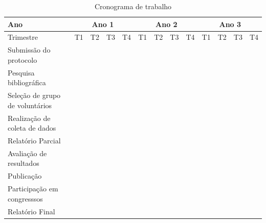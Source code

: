 \documentclass[rascunho,xindy]{Classe-Latex-FEI/fei}
\begin{document}
\begin{table}[ht]
  \caption{Cronograma de trabalho}
  \begin{center}
      \begin{tabular}{|l |l |l |l |l ||l |l |l |l ||l |l |l |l |}
      \hline
      Ano        & \multicolumn{4}{c||}{Ano 1} & \multicolumn{4}{c||}{Ano 2} & \multicolumn{4}{c|}{Ano 3} \\
      \hline
      Trimestre & T1 & T2 & T3 & T4 & T1 & T2 & T3 & T4 & T1 & T2 & T3 & T4 \\
      \hline
      Submissão do protocolo            & \cellcolor{black!80} & \cellcolor{black!80} & \cellcolor{black!80} & \cellcolor{black!80} &   &   &   &   &   &   &   &   \\
      Pesquisa bibliográfica            & \cellcolor{black!80} & \cellcolor{black!80} & \cellcolor{black!80} & \cellcolor{black!80} &   &   &   &   &   &   &   &   \\
      Seleção de grupo de voluntários   &   & \cellcolor{black!80} & \cellcolor{black!80} & \cellcolor{black!80} & \cellcolor{black!80} &   &   &   &   &   &   &   \\
      Realização de coleta de dados     &   &   &   & \cellcolor{black!80} & \cellcolor{black!80} & \cellcolor{black!80} &   &   &   &   &   &   \\
      Relatório Parcial                 &   &   &   & \cellcolor{black!80} & \cellcolor{black!80} & \cellcolor{black!80} & \cellcolor{black!80} &   &   &   &   &   \\
      Avaliação de resultados           &   &   &   &   & \cellcolor{black!80} & \cellcolor{black!80} & \cellcolor{black!80} & \cellcolor{black!80} & \cellcolor{black!80} &   &   &   \\ 
      Publicação                        &   &   &   &   &   & \cellcolor{black!80} & \cellcolor{black!80} & \cellcolor{black!80} & \cellcolor{black!80} &   &   &   \\
      Participação em congresssos       &   &   &   &   &   &   &   &   & \cellcolor{black!80} & \cellcolor{black!80} &   &   \\
      \hline
      Relatório Final                   &   & \cellcolor{black!80} & \cellcolor{black!80} & \cellcolor{black!80} & \cellcolor{black!80} & \cellcolor{black!80} & \cellcolor{black!80} & \cellcolor{black!80} & \cellcolor{black!80} & \cellcolor{black!80} & \cellcolor{black!80} & \cellcolor{black!80} \\
      \hline
      \end{tabular}
  \end{center}
  \label{table:cronograma}
\end{table} 
\end{document}
